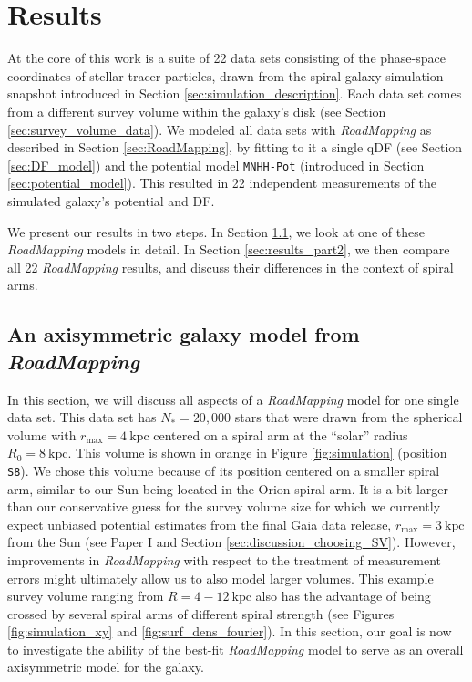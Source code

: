 \documentclass[iop,revtex4,numberedappendix,appendixfloats]{emulateapj}
\newcommand{\RM}{{\sl RoadMapping}}
\begin{document}
\section{Results} \label{sec:results}

At the core of this work is a suite of 22 data sets consisting of the phase-space coordinates of stellar tracer particles, drawn from the spiral galaxy simulation snapshot introduced in Section \ref{sec:simulation_description}. Each data set comes from a different survey volume within the galaxy's disk (see Section \ref{sec:survey_volume_data}). We modeled all data sets with \RM{} as described in Section \ref{sec:RoadMapping}, by fitting to it a single qDF (see Section \ref{sec:DF_model}) and the potential model \texttt{MNHH-Pot} (introduced in Section \ref{sec:potential_model}). This resulted in 22 independent measurements of the simulated galaxy's potential and DF.

We present our results in two steps. In Section \ref{sec:results_part1}, we look at one of these \RM{} models in detail. In Section \ref{sec:results_part2}, we then compare all 22 \RM{} results, and discuss their differences in the context of spiral arms.

\subsection{An axisymmetric galaxy model from \RM{}} \label{sec:results_part1}

In this section, we will discuss all aspects of a \RM{} model for one single data set. This data set has $N_*=20,000$ stars that were drawn from the spherical volume with $r_\text{max}=4~\text{kpc}$ centered on a spiral arm at the ``solar'' radius $R_0=8~\text{kpc}$. This volume is shown in orange in Figure \ref{fig:simulation} (position \texttt{S8}). We chose this volume because of its position centered on a smaller spiral arm, similar to our Sun being located in the Orion spiral arm. It is a bit larger than our conservative guess for the survey volume size for which we currently expect unbiased potential estimates from the final Gaia data release, $r_\text{max}=3~\text{kpc}$ from the Sun (see Paper I and Section \ref{sec:discussion_choosing_SV}). However, improvements in \RM{} with respect to the treatment of measurement errors might ultimately allow us to also model larger volumes. This example survey volume ranging from $R=4-12~\text{kpc}$ also has the advantage of being crossed by several spiral arms of different spiral strength (see Figures \ref{fig:simulation_xy} and \ref{fig:surf_dens_fourier}). In this section, our goal is now to investigate the ability of the best-fit \RM{} model to serve as an overall axisymmetric model for the galaxy.
\end{document}
